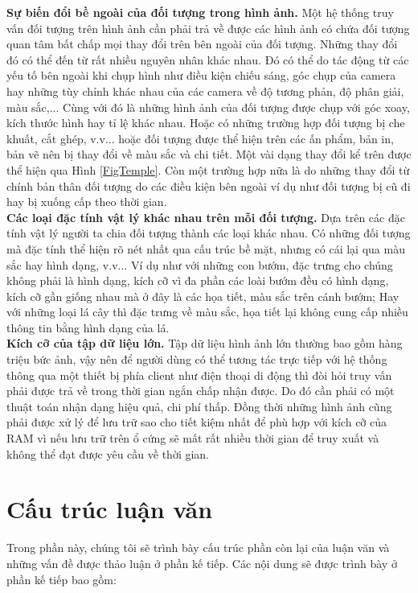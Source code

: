  \textbf{Sự biến đổi bề ngoài của đối tượng trong hình ảnh.} Một hệ thống truy vấn đối tượng trên hình ảnh cần phải trả về được các hình ảnh có chứa đối tượng quan tâm bất chấp mọi thay đổi trên bên ngoài của đối tượng. Những thay đổi đó có thể đến từ rất nhiều nguyên nhân khác nhau. Đó có thể do tác động từ các yếu tố bên ngoài khi chụp hình như điều kiện chiếu sáng, góc chụp của camera hay những tùy chỉnh khác nhau của các camera về độ tương phản, độ phân giải, màu sắc,... Cùng với đó là những hình ảnh của đối tượng được chụp với góc xoay, kích thước hình hay tỉ lệ khác nhau. Hoặc có những trường hợp đối tượng bị che khuất, cắt ghép, v.v... hoặc đối tượng được thể hiện trên các ấn phẩm, bản in, bản vẽ nên bị thay đổi về màu sắc và chi tiết. Một vài dạng thay đổi kể trên được thể hiện qua Hình \ref{FigTemple}. Còn một trường hợp nữa là do những thay đổi từ chính bản thân đối tượng do các điều kiện bên ngoài ví dụ như đối tượng bị cũ đi hay bị xuống cấp theo thời gian.\\ 
 \textbf{Các loại đặc tính vật lý khác nhau trên mỗi đối tượng.} Dựa trên các đặc tính vật lý người ta chia đối tượng thành các loại khác nhau. Có những đối tượng mà đặc tính thể hiện rõ nét nhất qua cấu trúc bề mặt, nhưng có cái lại qua màu sắc hay hình dạng, v.v... Ví dụ như với những con bướm, đặc trưng cho chúng không phải là hình dạng, kích cỡ vì đa phần các loài bướm đều có hình dạng, kích cỡ gần giống nhau mà ở đây là các họa tiết, màu sắc trên cánh bướm; Hay với những loại lá cây thì đặc trưng về màu sắc, họa tiết lại không cung cấp nhiều thông tin bằng hình dạng của lá.\\
 \textbf{Kích cỡ của tập dữ liệu lớn.} Tập dữ liệu hình ảnh lớn thường bao gồm hàng triệu bức ảnh, vậy nên để người dùng có thể tương tác trực tiếp với hệ thống thông qua một thiết bị phía client như điện thoại di động thì đòi hỏi truy vấn phải được trả về trong thời gian ngắn chấp nhận được. Do đó cần phải có một thuật toán nhận dạng hiệu quả, chi phí thấp. Đồng thời những hình ảnh cũng phải được xử lý để lưu trữ sao cho tiết kiệm nhất để phù hợp với kích cỡ của RAM vì nếu lưu trữ trên ổ cứng sẽ mất rất nhiều thời gian để truy xuất và không thể đạt được yêu cầu về thời gian.\\

\section{Cấu trúc luận văn}
Trong phần này, chúng tôi sẽ trình bày cấu trúc phần còn lại của luận văn và những vấn đề được thảo luận ở phần kế tiếp. Các nội dung sẽ được trình bày ở phần kế tiếp bao gồm:


